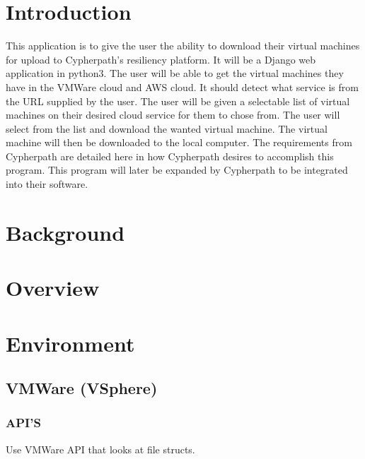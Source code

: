 \documentclass{article}
\title{}
\author{}
\date{}
\begin{document}
    

    \tableofcontents
    \listoffigures

    \newpage
    \begin{versionhistory}
    \end{versionhistory}
    \newpage

    \section{Introduction}
    This application is to give the user the ability to download their virtual machines for upload to Cypherpath’s resiliency platform. It will be a Django web application in python3. The user will be able to get the virtual machines they have in the VMWare cloud and AWS cloud. It should detect what service is from the URL supplied by the user. The user will be given a selectable list of virtual machines on their desired cloud service for them to chose from. The user will select from the list and download the wanted virtual machine. The virtual machine will then be downloaded to the local computer. 
    The requirements from Cypherpath are detailed here in how Cypherpath desires to accomplish this program. This program will later be expanded by Cypherpath to be integrated into their software.     
    
    \section{Background}

    \section{Overview}

    \section{Environment}

        \subsection{VMWare (VSphere)}

            \subsubsection{API'S}
            Use VMWare API that looks at file structs.
\end{document}

